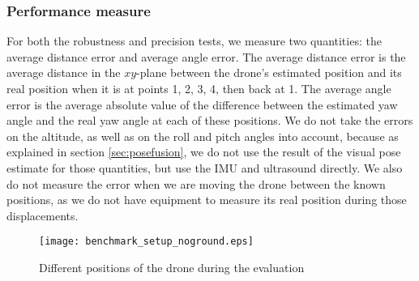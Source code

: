 \subsubsection{Performance measure}
For both the robustness and precision tests, we measure two quantities: the average distance error and average angle error. The average distance error is the average distance in the $xy$-plane between the drone's estimated position and its real position when it is at points 1, 2, 3, 4, then back at 1. The average angle error is the average absolute value of the difference between the estimated yaw angle and the real yaw angle at each of these positions. We do not take the errors on the altitude, as well as on the roll and pitch angles into account, because as explained in section \ref{sec:posefusion}, we do not use the result of the visual pose estimate for those quantities, but use the IMU and ultrasound directly. We also do not measure the error when we are moving the drone between the known positions, as we do not have equipment to measure its real position during those displacements.
\newpage
\begin{figure}[H]
  \centering
  \texttt{[image: benchmark\_setup\_noground.eps]}
  \caption{Different positions of the drone during the evaluation}
  \label{fig:benchmarksetup}
\end{figure}

